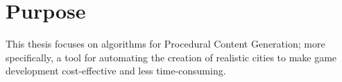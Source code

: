 \section{Purpose}
\begin{comment}
\textcolor{red}{
Syftet specificerar vad projektet är tänkt att resultera i och vilken typ av resultat som kommer att uppnås. Ett projekt kan ha flera syften som är relaterade till de ämnen/problem som presenteras i bakgrunden. I de flesta fall är det dock lämpligt att ha endast ett generellt syfte, som sedan bryts ner i mer detaljerade delar längre fram i kandidatarbetets process och uppsats/rapport.
}
\end{comment}

This thesis focuses on algorithms for Procedural Content Generation; more specifically, a tool for automating the creation of realistic cities to make game development cost-effective and less time-consuming.